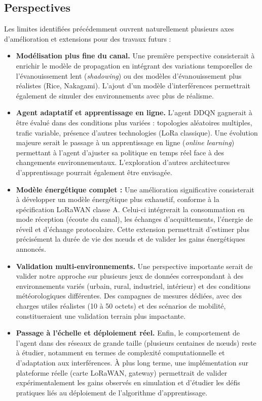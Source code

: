 \subsection{Perspectives}

Les limites identifiées précédemment ouvrent naturellement plusieurs axes d'amélioration et extensions pour des travaux futurs :

\begin{itemize}
	\item \textbf{Modélisation plus fine du canal.} Une première perspective consisterait à enrichir le modèle de propagation en intégrant des variations temporelles de l'évanouissement lent (\textit{shadowing}) ou des modèles d'évanouissement plus réalistes (Rice, Nakagami). L'ajout d'un modèle d'interférences permettrait également de simuler des environnements avec plus de réalisme.
	
	\item \textbf{Agent adaptatif et apprentissage en ligne.} L'agent DDQN gagnerait à être évalué dans des conditions plus variées : topologies aléatoires multiples, trafic variable, présence d'autres technologies (LoRa classique). Une évolution majeure serait le passage à un apprentissage en ligne (\textit{online learning}) permettant à l'agent d'ajuster sa politique en temps réel face à des changements environnementaux. L'exploration d'autres architectures d'apprentissage pourrait également être envisagée.
	
	\item \textbf{Modèle énergétique complet :} Une amélioration significative consisterait à développer un modèle énergétique plus exhaustif, conforme à la spécification LoRaWAN classe A. Celui-ci intégrerait la consommation en mode réception (écoute du canal), les échanges d'acquittements, l'énergie de réveil et d'échange protocolaire. Cette extension permettrait d'estimer plus précisément la durée de vie des nœuds et de valider les gains énergétiques annoncés.
	
	\item \textbf{Validation multi-environnements.} Une perspective importante serait de valider notre approche sur plusieurs jeux de données correspondant à des environnements variés (urbain, rural, industriel, intérieur) et des conditions météorologiques différentes. Des campagnes de mesures dédiées, avec des charges utiles réalistes (10 à 50 octets) et des scénarios de mobilité, constitueraient une validation terrain plus impactante.
	
	\item \textbf{Passage à l'échelle et déploiement réel.} Enfin, le comportement de l'agent dans des réseaux de grande taille (plusieurs centaines de nœuds) reste à étudier, notamment en termes de complexité computationnelle et d'adaptation aux interférences. À plus long terme, une implémentation sur plateforme réelle (carte LoRaWAN, gateway) permettrait de valider expérimentalement les gains observés en simulation et d'étudier les défis pratiques liés au déploiement de l'algorithme d'apprentissage.
	
\end{itemize}



